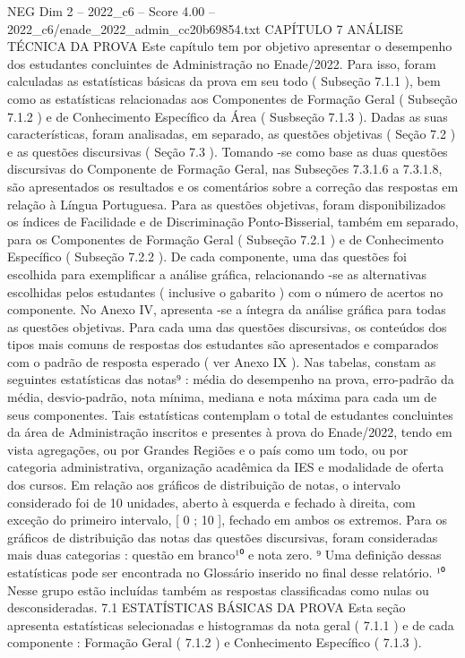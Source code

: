 \begin{textsample}{NEG Dim 2 – 2022\_c6 – Score 4.00 – 2022\_c6/enade\_2022\_admin\_cc20b69854.txt}  \label{ex:f2_neg_298}
CAPÍTULO 7 ANÁLISE TÉCNICA DA PROVA Este capítulo tem por objetivo apresentar o desempenho dos estudantes concluintes de Administração no Enade/2022.
Para isso, foram calculadas as estatísticas básicas da prova em seu todo ( Subseção 7.1.1 ), bem como as estatísticas relacionadas aos Componentes de Formação Geral ( Subseção 7.1.2 ) e de Conhecimento Específico da Área ( Susbseção 7.1.3 ).
Dadas as suas características, foram analisadas, em separado, as questões objetivas ( Seção 7.2 ) e as questões discursivas ( Seção 7.3 ).
Tomando -se como base as duas questões discursivas do Componente de Formação Geral, nas Subseções 7.3.1.6 a 7.3.1.8, são apresentados os resultados e os comentários sobre a correção das respostas em relação à Língua Portuguesa.
Para as questões objetivas, foram disponibilizados os índices de Facilidade e de Discriminação Ponto-Bisserial, também em separado, para os Componentes de Formação Geral ( Subseção 7.2.1 ) e de Conhecimento Específico ( Subseção 7.2.2 ).
De cada componente, uma das questões foi escolhida para exemplificar a análise gráfica, relacionando -se as alternativas escolhidas pelos estudantes ( inclusive o gabarito ) com o número de acertos no componente.
No Anexo IV, apresenta -se a íntegra da análise gráfica para todas as questões objetivas.
Para cada uma das questões discursivas, os conteúdos dos tipos mais comuns de respostas dos estudantes são apresentados e comparados com o padrão de resposta esperado ( ver Anexo IX ).
Nas tabelas, constam as seguintes estatísticas das notas⁹ : média do desempenho na prova, erro-padrão da média, desvio-padrão, nota mínima, mediana e nota máxima para cada um de seus componentes.
Tais estatísticas contemplam o total de estudantes concluintes da área de Administração inscritos e presentes à prova do Enade/2022, tendo em vista agregações, ou por Grandes Regiões e o país como um todo, ou por categoria administrativa, organização acadêmica da IES e modalidade de oferta dos cursos.
Em relação aos gráficos de distribuição de notas, o intervalo considerado foi de 10 unidades, aberto à esquerda e fechado à direita, com exceção do primeiro intervalo, [ 0 ; 10 ], fechado em ambos os extremos.
Para os gráficos de distribuição das notas das questões discursivas, foram consideradas mais duas categorias : questão em branco¹⁰ e nota zero. ⁹ Uma definição dessas estatísticas pode ser encontrada no Glossário inserido no final desse relatório. ¹⁰ Nesse grupo estão incluídas também as respostas classificadas como nulas ou desconsideradas. 7.1 ESTATÍSTICAS BÁSICAS DA PROVA Esta seção apresenta estatísticas selecionadas e histogramas da nota geral ( 7.1.1 ) e de cada componente : Formação Geral ( 7.1.2 ) e Conhecimento Específico ( 7.1.3 ).

\end{textsample}
